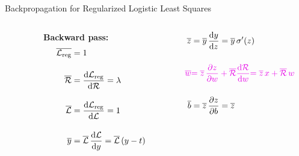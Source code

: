 \documentclass[handout,aspectratio=169]{beamer}
\begin{document}
\begin{frame}{Backpropagation for Regularized Logistic Least Squares}
\begin{columns}
\begin{column}{0.35 \linewidth}
    \end{column}
    \pause
    \begin{column}{0.3 \linewidth}
      {\bf Backward pass:}
        \begin{align*}
          \overline{{\cal L}_{\rm reg}} &= 1 \\[4mm]
          \overline{\mathcal{R}} &= \frac{\mathrm{d} {\cal L}_{\rm reg}}{\mathrm{d} \mathcal{R}} = \lambda  \\[4mm]
          \overline{{\cal L}} &= \frac{\mathrm{d} {\cal L}_{\rm reg}}{\mathrm{d} {\cal L}} = 1 \\[4mm]
          \overline{y} &= \overline{{\cal L}}\, \frac{\mathrm{d} {\cal L}}{\mathrm{d} y} = \overline{{\cal L}}\, (y - t) \\
        \end{align*}
    \end{column}
    \pause
    \begin{column}{0.35 \linewidth}
        \begin{align*}
          \costDeriv{\intermediate} &= \costDeriv{\prediction} \, \frac{\deriv \prediction}{\deriv \intermediate} = \costDeriv{\prediction} \, \logistic^\prime(\intermediate) \\[5mm]
          \textcolor[rgb]{0.9, 0, 0.9}{\costDeriv{\weightUni}} & \textcolor[rgb]{0.9, 0, 0.9}{= \costDeriv{\intermediate} \, \frac{\partial \intermediate}{\partial \weightUni} + \costDeriv{\regularizer} \frac{\deriv \regularizer}{\deriv \weightUni}}   \textcolor[rgb]{0.9, 0, 0.9}{= \costDeriv{\intermediate} \, \inputUni + \costDeriv{\regularizer} \, \weightUni } \\[5mm]
          \costDeriv{\bias} &= \costDeriv{\intermediate} \, \frac{\partial \intermediate}{\partial \bias} = \costDeriv{\intermediate}
        \end{align*}
    \end{column}
  \end{columns}
\end{frame}
\end{document}
